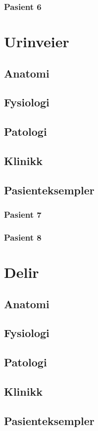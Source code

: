 \documentclass[12pt]{memoir} %
\begin{document}
\begin{itemize}
			\subsection{Pasient 6}
	\chapter{Urinveier}
		\section{Anatomi}
		\section{Fysiologi}
		\section{Patologi}
		\section{Klinikk}
		\section{Pasienteksempler}
			\subsection{Pasient 7}
			\subsection{Pasient 8}
	\chapter{Delir}
		\section{Anatomi}
		\section{Fysiologi}
		\section{Patologi}
		\section{Klinikk}
		\section{Pasienteksempler}

\end{itemize}
\end{document}
